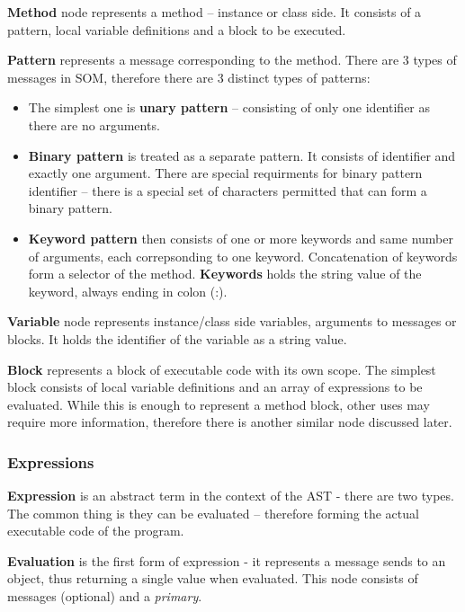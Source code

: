 \documentclass[thesis=M,english]{FITthesis}[2019/12/23]
\begin{document}
\textbf{Method} node represents a method -- instance or class side. It consists of a pattern, local variable definitions and a block
to be executed.

\textbf{Pattern} represents a message corresponding to the method. There are 3 types of messages in SOM, therefore there are 3 distinct
types of patterns:
\begin{itemize}
	\item The simplest one is \textbf{unary pattern} -- consisting of only one identifier as there are no arguments.
	\item \textbf{Binary pattern} is treated as a separate pattern. It consists of identifier and exactly one argument. 
		There are special requirments for binary pattern identifier -- there is a special set of characters permitted 
		that can form a binary pattern.
	\item \textbf{Keyword pattern} then consists of one or more keywords and same number of arguments, each correpsonding 
		to one keyword. Concatenation of keywords form a selector of the method. \textbf{Keywords} holds the string
		value of the keyword, always ending in colon (:).
\end{itemize}

\textbf{Variable} node represents instance/class side variables, arguments to messages or blocks. It holds the identifier of the variable as a string value.

\textbf{Block} represents a block of executable code with its own scope. The simplest block consists of local variable definitions and an array of
expressions to be evaluated. While this is enough to represent a method block, other uses may require more information, therefore there is another
similar node discussed later.

\subsubsection{Expressions}
\textbf{Expression} is an abstract term in the context of the AST - there are two types. The common thing is they can be evaluated -- therefore forming
the actual executable code of the program. 

\textbf{Evaluation} is the first form of expression - it represents a message sends to an object, thus returning a single value when evaluated. This node
consists of messages (optional) and a \textit{primary}.
\end{document}
